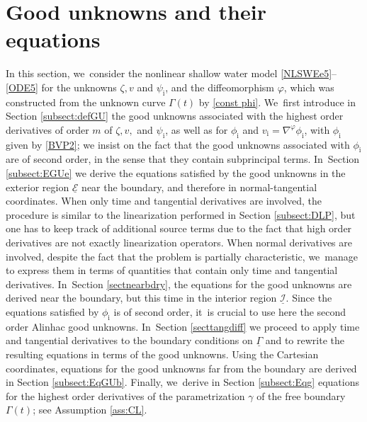 \documentclass[JEP,XML,SOM,Unicode,NoFloatCountersInSection,published]{cedram}
\newcommand{\cI}{{\mathcal I}}
\newcommand{\cE}{{\mathcal E}}
\newcommand{\ul}[1]{\underline{#1}}
\newcommand{\itGamma}{\mathit{\Gamma}}
\theoremstyle{definition}
\begin{document}
\section{Good unknowns and their equations}\label{sect:GU}
In this section, we~consider the nonlinear shallow water model \eqref{NLSWEe5}--\eqref{ODE5} for the unknowns $\zeta,v$ and $\psi_\mathrm{i}$,
and the diffeomorphism $\varphi$, which was constructed from the unknown curve $\itGamma(t)$ by \eqref{const phi}. We~first introduce in Section \ref{subsect:defGU} the good unknowns associated with the highest order derivatives of order $m$ of
$\zeta,v,$ and $\psi_\mathrm{i}$, as well as for $\phi_\mathrm{i}$ and $v_\mathrm{i}=\nabla^\varphi \phi_\mathrm{i}$, with $\phi_\mathrm{i}$ given by \eqref{BVP2};
we insist on the fact that the good unknowns associated with $\phi_\mathrm{i}$ are of second order, in the sense that they contain subprincipal terms. In~Section \ref{subsect:EGUe} we derive the equations satisfied by the good unknowns in the exterior region $\ul{\cE}$ near the boundary,
and therefore in normal-tangential coordinates.
When only time and tangential derivatives are involved, the procedure is similar to the linearization performed in Section \ref{subsect:DLP},
but one has to keep track of additional source terms due to the fact that high order derivatives are not exactly linearization operators.
When normal derivatives are involved, despite the fact that the problem is partially characteristic, we~manage to express them in terms of quantities that contain only time and tangential derivatives. In~Section \ref{sectnearbdry}, the equations for the good unknowns are derived near the boundary, but this time in the interior region $\ul{\cI}$.
Since the equations satisfied by $\phi_\mathrm{i}$ is of second order, it~is crucial to use here the second order Alinhac good unknowns. In~Section \ref{secttangdiff} we proceed to apply time and tangential derivatives to the boundary conditions on $\ul{\itGamma}$
and to rewrite the resulting equations in terms of the good unknowns.
Using the Cartesian coordinates, equations for the good unknowns far from the boundary are derived in Section \ref{subsect:EqGUb}.
Finally, we~derive in Section \ref{subsect:Eqg} equations for the highest order derivatives of the parametrization $\gamma$ of the free boundary $\itGamma(t)$;
see Assumption \ref{ass:CL}.
\end{document}
